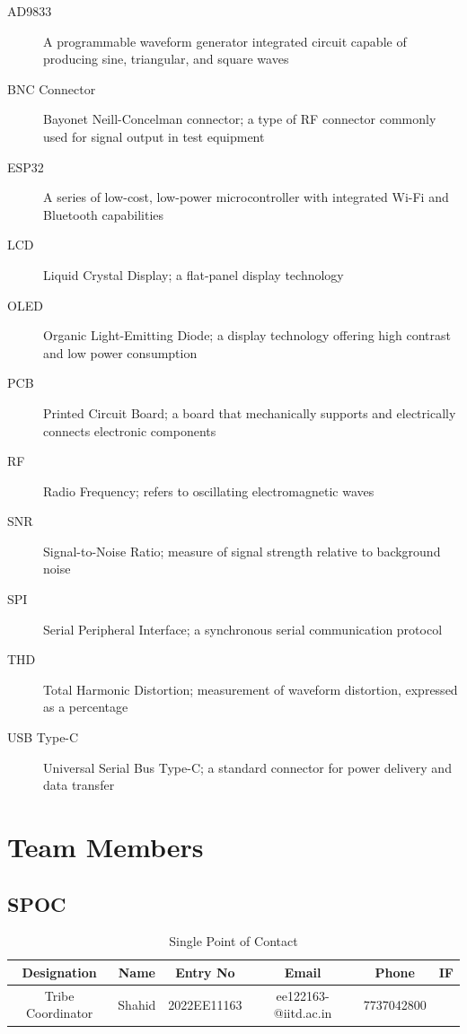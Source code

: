 \documentclass[a4paper,12pt]{article}
\begin{document}
\begin{description}
    \item[AD9833] A programmable waveform generator integrated circuit capable of producing sine, triangular, and square waves
    
    \item[BNC Connector] Bayonet Neill-Concelman connector; a type of RF connector commonly used for signal output in test equipment
    
    
    \item[ESP32] A series of low-cost, low-power microcontroller with integrated Wi-Fi and Bluetooth capabilities
    
    
    \item[LCD] Liquid Crystal Display; a flat-panel display technology
    
    
    \item[OLED] Organic Light-Emitting Diode; a display technology offering high contrast and low power consumption
    
    \item[PCB] Printed Circuit Board; a board that mechanically supports and electrically connects electronic components
    
    \item[RF] Radio Frequency; refers to oscillating electromagnetic waves
    
    \item[SNR] Signal-to-Noise Ratio; measure of signal strength relative to background noise
    
    \item[SPI] Serial Peripheral Interface; a synchronous serial communication protocol
    
    
    \item[THD] Total Harmonic Distortion; measurement of waveform distortion, expressed as a percentage
    
    \item[USB Type-C] Universal Serial Bus Type-C; a standard connector for power delivery and data transfer
    
\end{description}

\newpage
\section{Team Members}
\subsection{SPOC}
\begin{table}[H]
    \centering 
    \caption{Single Point of Contact} 
    \begin{tabu}{c|c|c|c|c|c} 
        \toprule 
        \textbf{Designation} & \textbf{Name} & \textbf{Entry No} & \textbf{Email} & \textbf{Phone} & \textbf{IF} \\ 
        \midrule 
        Tribe Coordinator & Shahid  & 2022EE11163 & ee122163-
        @iitd.ac.in & 7737042800 &\\ 
        \bottomrule 
    \end{tabu} 
    \label{tab:spoc}
\end{table}
\end{document}
